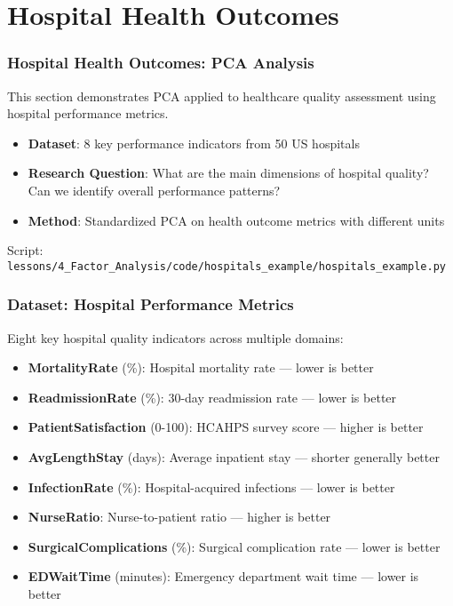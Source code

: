 \documentclass[aspectratio=169]{beamer}
\begin{document}
\section{Hospital Health Outcomes}

\begin{frame}
    \frametitle{Hospital Health Outcomes: PCA Analysis}
    This section demonstrates PCA applied to healthcare quality assessment using hospital performance metrics.
    \begin{itemize}
        \item \textbf{Dataset}: 8 key performance indicators from 50 US hospitals \pause
        \item \textbf{Research Question}: What are the main dimensions of hospital quality? Can we identify overall performance patterns? \pause
        \item \textbf{Method}: Standardized PCA on health outcome metrics with different units \pause
    \end{itemize}
    \vspace{6pt}
    Script: \texttt{lessons/4\_Factor\_Analysis/code/hospitals\_example/hospitals\_example.py}
\end{frame}

\begin{frame}
    \frametitle{Dataset: Hospital Performance Metrics}
    Eight key hospital quality indicators across multiple domains:
    \begin{itemize}
        \item \textbf{MortalityRate} (\%): Hospital mortality rate — lower is better \pause
        \item \textbf{ReadmissionRate} (\%): 30-day readmission rate — lower is better \pause
        \item \textbf{PatientSatisfaction} (0-100): HCAHPS survey score — higher is better \pause
        \item \textbf{AvgLengthStay} (days): Average inpatient stay — shorter generally better \pause
    \end{itemize}
    \vspace{6pt}
    \begin{itemize}
        \item \textbf{InfectionRate} (\%): Hospital-acquired infections — lower is better \pause
        \item \textbf{NurseRatio}: Nurse-to-patient ratio — higher is better \pause
        \item \textbf{SurgicalComplications} (\%): Surgical complication rate — lower is better \pause
        \item \textbf{EDWaitTime} (minutes): Emergency department wait time — lower is better \pause
    \end{itemize}
\end{frame}
\end{document}
